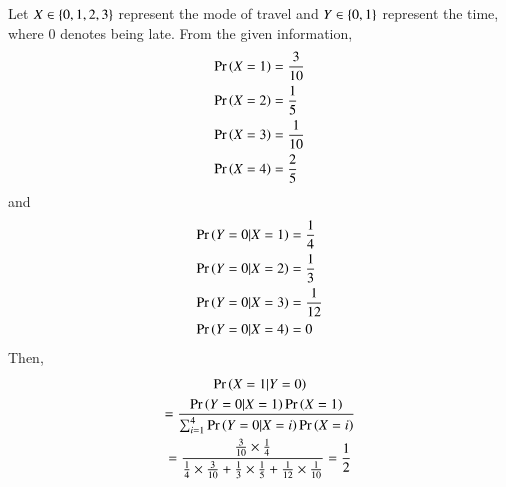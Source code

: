 Let $X \in \left\{0,1,2,3\right\}$ represent the mode of travel and $Y \in \left\{0,1\right\}$ represent the time, where 0 denotes being late.  From the given information, 
\begin{align}
\Pr\left(X=1\right) &= \frac{3}{10}
\\
\Pr\left(X=2\right) &= \frac{1}{5}
\\
\Pr\left(X=3\right) &= \frac{1}{10}
\\
\Pr\left(X=4\right) &= \frac{2}{5}
\end{align}
and
\begin{align}
\Pr\left(Y = 0|X=1\right) &= \frac{1}{4}
\\
\Pr\left(Y=0|X=2\right) &= \frac{1}{3}
\\
\Pr\left(Y=0|X=3\right) &= \frac{1}{12}
\\
\Pr\left(Y=0|X=4\right) &= 0
\end{align}
Then,
\begin{multline}
\Pr\left(X=1|Y=0\right) 
\\
= \frac{\Pr\left(Y=0|X=1\right)\Pr\left(X=1\right)}{\sum_{i=1}^{4}\Pr\left(Y=0|X=i\right)\Pr\left(X=i\right)}
\\
=\frac{\frac{3}{10}\times\frac{1}{4}}{\frac{1}{4}\times\frac{3}{10}+\frac{1}{3}\times\frac{1}{5}+\frac{1}{12}\times\frac{1}{10}}
=\frac{1}{2}
\end{multline}
